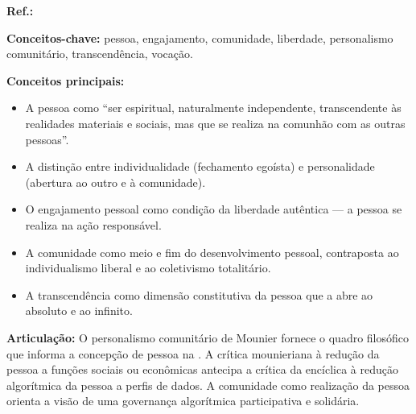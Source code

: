 \begin{fichamento}
    \textbf{Ref.:} \cite{Mounier1949P}
    
    \textbf{Conceitos-chave:} pessoa, engajamento, comunidade, liberdade, personalismo comunitário, transcendência, vocação.
    
    \textbf{Conceitos principais:}
    \begin{itemize}
        \item A pessoa como ``ser espiritual, naturalmente independente, transcendente às realidades materiais e sociais, mas que se realiza na comunhão com as outras pessoas''.
        \item A distinção entre individualidade (fechamento egoísta) e personalidade (abertura ao outro e à comunidade).
        \item O engajamento pessoal como condição da liberdade autêntica — a pessoa se realiza na ação responsável.
        \item A comunidade como meio e fim do desenvolvimento pessoal, contraposta ao individualismo liberal e ao coletivismo totalitário.
        \item A transcendência como dimensão constitutiva da pessoa que a abre ao absoluto e ao infinito.
    \end{itemize}
    
    \textbf{Articulação:} O personalismo comunitário de Mounier fornece o quadro filosófico que informa a concepção de pessoa na \MH{}. A crítica mounieriana à redução da pessoa a funções sociais ou econômicas antecipa a crítica da encíclica à redução algorítmica da pessoa a perfis de dados. A comunidade como realização da pessoa orienta a visão de uma governança algorítmica participativa e solidária.
\end{fichamento}

